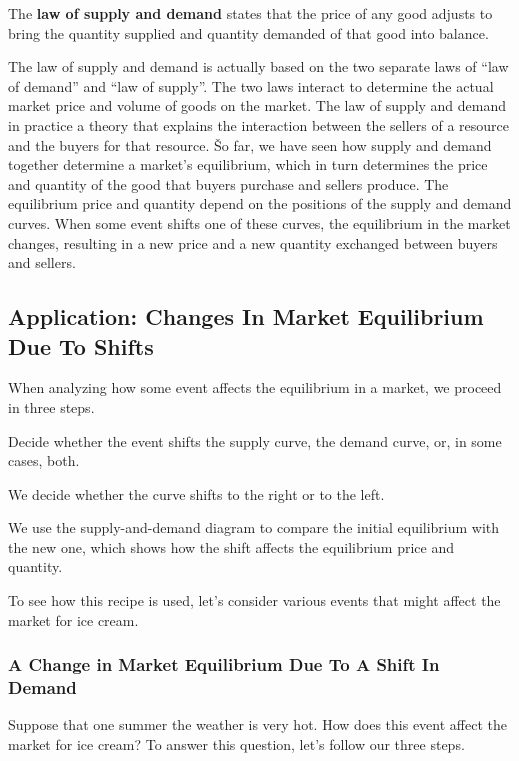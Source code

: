 The \textbf{law of supply and demand} states that the price of any good adjusts to bring the quantity supplied and
quantity demanded of that good into balance.
\ed

The law of supply and demand is actually based on the two separate laws of ``law of demand'' and ``law of supply''.
The two laws interact to determine the actual market price and volume of goods on the market. The law of supply and
demand in practice a theory that explains the interaction between the sellers of a resource and the buyers for that
resource. \v

So far, we have seen how supply and demand together determine a market's equilibrium, which in turn determines the
price and quantity of the good that buyers purchase and sellers produce. The equilibrium price and quantity depend on
the positions of the supply and demand curves. When some event shifts one of these curves, the equilibrium in the
market changes, resulting in a new price and a new quantity exchanged between buyers and sellers.

\subsection{Application: Changes In Market Equilibrium Due To Shifts}

When analyzing how some event affects the equilibrium in a market, we proceed in three steps.

\ben
\item Decide whether the event shifts the supply curve, the demand curve, or, in some cases, both.
\item We decide whether the curve shifts to the right or to the left.
\item We use the supply-and-demand diagram to compare the initial equilibrium with the new one, which shows how the
shift affects the equilibrium price and quantity.
\een

To see how this recipe is used, let's consider various events that might affect the market for ice cream.

\subsubsection*{A Change in Market Equilibrium Due To A Shift In Demand}


Suppose that one summer the weather is very hot. How does this event affect the market for ice cream? To answer this
question, let's follow our three steps.

